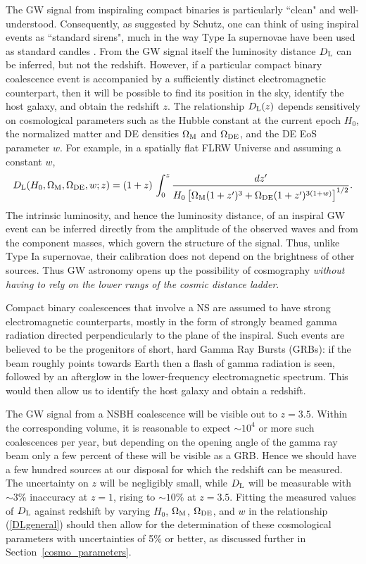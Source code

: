 The GW signal from inspiraling compact binaries is particularly ``clean" and well-understood. Consequently, as suggested by Schutz, one can think of using inspiral events as ``standard sirens", much in the way Type Ia supernovae have been used as standard candles \cite{Schutz86}. From the GW signal itself the luminosity distance $D_{\rm L}$ can be inferred, but not the redshift. However, if a particular compact binary coalescence event is accompanied by a sufficiently distinct electromagnetic counterpart, then it will be possible to find its position in the sky, identify the host galaxy, and obtain the redshift $z$. The relationship $D_{\rm L}(z)$ depends sensitively on cosmological parameters such as the Hubble constant at the current epoch $H_0$, the normalized matter and DE densities $\Omega_{\rm M}$ and $\Omega_{\rm DE}$, and the DE EoS parameter $w$. For example, in a spatially flat FLRW Universe and assuming a constant $w$,
\begin{equation}
D_{\rm L}(H_0, \Omega_{\rm M}, \Omega_{\rm DE}, w; z) = (1+z)\,\int_0^z \frac{dz'}{H_0 \left[ \Omega_{\rm M}(1+z')^3 + \Omega_{\rm DE} (1+z')^{3(1+w)} \right]^{1/2}}.
\label{DLgeneral}
\end{equation}
The intrinsic luminosity, and hence the luminosity distance, of an inspiral GW event can be inferred directly from the amplitude of the observed waves and from the component masses, which govern the structure of the signal. Thus, unlike Type Ia supernovae, their calibration does not depend on the brightness of other sources. Thus GW astronomy opens up the possibility of cosmography \emph{without having to rely on the lower rungs of the cosmic distance ladder}.

Compact binary coalescences that involve a NS are assumed to have strong electromagnetic counterparts, mostly in the form of strongly beamed gamma radiation directed perpendicularly to the plane of the inspiral. Such events are believed to be the progenitors of short, hard Gamma Ray Bursts (GRBs): if the beam roughly points towards Earth then a flash of gamma radiation is seen, followed by an afterglow in the lower-frequency electromagnetic spectrum.
This would then allow us to identify the host galaxy and obtain a redshift.

The GW signal from a NSBH coalescence will be visible out to $z = 3.5$. Within the corresponding volume, it is reasonable to expect $\sim 10^4$ or more such coalescences per year, but depending on the opening angle of the gamma ray beam only a few percent of these will be visible as a GRB. Hence we should have a few hundred sources at our disposal for which the redshift can be measured. The uncertainty on $z$ will be negligibly small, while $D_{\rm L}$ will be measurable with $\sim 3$\% inaccuracy at $z = 1$, rising to $\sim 10$\% at $z = 3.5$. Fitting the measured values of $D_{\rm L}$ against redshift by varying $H_0$, $\Omega_{\rm M}$, $\Omega_{\rm DE}$, and $w$ in the relationship (\ref{DLgeneral}) should then allow for the determination of these cosmological parameters with uncertainties of 5\% or better, as discussed further in Section~\ref{cosmo_parameters}.

